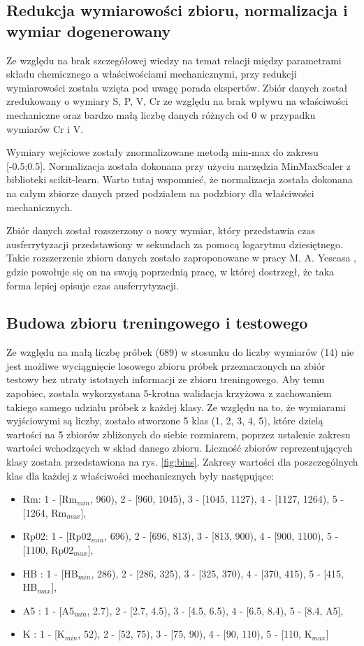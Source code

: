 \subsection{Redukcja wymiarowości zbioru, normalizacja i wymiar dogenerowany}
Ze względu na brak szczegółowej wiedzy na temat relacji między parametrami składu chemicznego a właściwościami mechanicznymi, przy redukcji wymiarowości została wzięta pod uwagę porada ekspertów. Zbiór danych został zredukowany o wymiary S, P, V, Cr ze względu na brak wpływu na właściwości mechaniczne oraz bardzo małą liczbę danych różnych od 0 w przypadku wymiarów Cr i V.

Wymiary wejściowe zostały znormalizowane metodą min-max do zakresu [-0.5;0.5]. Normalizacja została dokonana przy użyciu narzędzia MinMaxScaler z biblioteki scikit-learn. Warto tutaj wspomnieć, że normalizacja została dokonana na całym zbiorze danych przed podziałem na podzbiory dla właściwości mechanicznych.

Zbiór danych został rozszerzony o nowy wymiar, który przedstawia czas ausferrytyzacji przedstawiony w sekundach za pomocą logarytmu dziesiętnego. Takie rozszerzenie zbioru danych zostało zaproponowane w pracy M. A. Yescasa \cite{YESCAS2001162}, gdzie powołuje się on na swoją poprzednią pracę, w której dostrzegł, że taka forma lepiej opisuje czas ausferrytyzacji.

\subsection{Budowa zbioru treningowego i testowego}\label{sec:dataset}
Ze względu na małą liczbę próbek (689) w stosunku do liczby wymiarów (14) nie jest możliwe wyciągnięcie losowego zbioru próbek przeznaczonych na zbiór testowy bez utraty istotnych informacji ze zbioru treningowego. Aby temu zapobiec, została wykorzystana 5-krotna walidacja krzyżowa z zachowaniem takiego samego udziału próbek z każdej klasy. Ze względu na to, że wymiarami wyjściowymi są liczby, zostało stworzone 5 klas (1, 2, 3, 4, 5), które dzielą wartości na 5 zbiorów zbliżonych do siebie rozmiarem, poprzez ustalenie zakresu wartości wchodzących w skład danego zbioru. Liczność zbiorów reprezentujących klasy została przedstawiona na rys. \ref{fig:bins}. Zakresy wartości dla poszczególnych klas dla każdej z właściwości mechanicznych były następujące:
\begin{itemize}
    \item Rm: 1 - [Rm$_{min}$, 960), 2 - [960, 1045), 3 - [1045, 1127), 4 - [1127, 1264), 5 - [1264, Rm$_{max}$],
    \item Rp02: 1 - [Rp02$_{min}$, 696), 2 - [696, 813), 3 - [813, 900), 4 - [900, 1100), 5 - [1100, Rp02$_{max}$],
    \item HB : 1 - [HB$_{min}$, 286), 2 - [286, 325), 3 - [325, 370), 4 - [370, 415), 5 - [415, HB$_{max}$],
    \item A5 : 1 - [A5$_{min}$, 2.7), 2 - [2.7, 4.5), 3 - [4.5, 6.5), 4 - [6.5, 8.4), 5 - [8.4, A5],
    \item K : 1 - [K$_{min}$, 52), 2 - [52, 75), 3 - [75, 90), 4 - [90, 110), 5 - [110, K$_{max}$]
\end{itemize}

